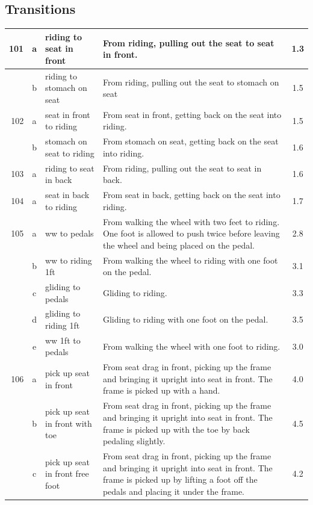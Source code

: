 \subsection{Transitions}
\begin{longtable}{|r|c|p{4cm}|p{8cm}|c|}
\hline
101 & a & riding to seat in front & From riding, pulling out the seat to seat in front. & 1.3 \\ 
\hline
  & b & riding to stomach on seat & From riding, pulling out the seat to stomach on seat  & 1.5 \\ 
\hline
102 & a & seat in front to riding & From seat in front, getting back on the seat into riding. & 1.5 \\ 
\hline
  & b & stomach on seat to riding & From stomach on seat, getting back on the seat into riding. & 1.6 \\ 
\hline
103 & a & riding to seat in back  & From riding, pulling out the seat to seat in back.  & 1.6 \\ 
\hline
104 & a & seat in back to riding  & From seat in back, getting back on the seat into riding.  & 1.7 \\ 
\hline
105 & a & ww to pedals  & From walking the wheel with two feet to riding. One foot is allowed to push twice before leaving the wheel and being placed on the pedal. & 2.8 \\ 
\hline
  & b & ww to riding 1ft  & From walking the wheel to riding with one foot on the pedal.  & 3.1 \\ 
\hline
  & c & gliding to pedals & Gliding to riding.  & 3.3 \\ 
\hline
  & d & gliding to riding 1ft & Gliding to riding with one foot on the pedal. & 3.5 \\ 
\hline
  & e & ww 1ft to pedals  & From walking the wheel with one foot to riding. & 3.0 \\ 
\hline
106 & a & pick up seat in front & From seat drag in front, picking up the frame and bringing it upright into seat in front. The frame is picked up with a hand. & 4.0 \\ 
\hline
  & b & pick up seat in front with toe  & From seat drag in front, picking up the frame and bringing it upright into seat in front. The frame is picked up with the toe by back pedaling slightly.  & 4.5 \\ 
\hline
  & c & pick up seat in front free foot & From seat drag in front, picking up the frame and bringing it upright into seat in front. The frame is picked up by lifting a foot off the pedals and placing it under the frame. & 4.2 \\ 

\end{longtable}
